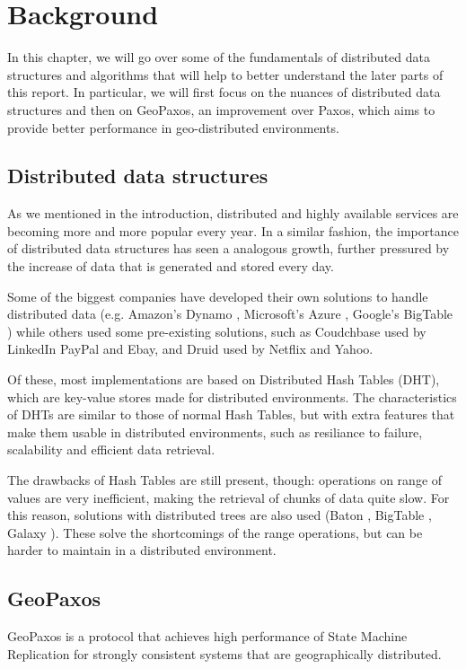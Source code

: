 \chapter{Background}\label{sec:Background}
In this chapter, we will go over some of the fundamentals of distributed data structures and algorithms that will help to better understand the later parts of this report. In particular, we will first focus on the nuances of distributed data structures and then on  GeoPaxos, an improvement over Paxos, which aims to provide better performance in geo-distributed environments.

\section{Distributed data structures}\label{sec:distributed-data-structures}
As we mentioned in the introduction, distributed and highly available services are becoming more and more popular every year. In a similar fashion, the importance of distributed data structures has seen a analogous growth, further pressured by the increase of data that is generated and stored every day. 

Some of the biggest companies have developed their own solutions to handle distributed data (e.g. Amazon's Dynamo \citep{dynamo}, Microsoft's Azure \citep{azure}, Google's BigTable \citep{bigtable}) while others used some pre-existing solutions, such as Coudchbase \citep{couchbase} used by LinkedIn PayPal and Ebay, and Druid \citep{druid} used by Netflix and Yahoo. 

Of these, most implementations are based on Distributed Hash Tables (DHT), which are key-value stores made for distributed environments.
The characteristics of DHTs are similar to those of normal Hash Tables, but with extra features that make them usable in distributed environments, such as resiliance to failure, scalability and efficient data retrieval.

The drawbacks of Hash Tables are still present, though: operations on range of values are very inefficient, making the retrieval of chunks of data quite slow. For this reason, solutions with distributed trees are also used (Baton \citep{baton}, BigTable \citep{bigtable}, Galaxy \citep{galaxy}). These solve the shortcomings of the range operations, but can be harder to maintain in a distributed environment. 

\section{GeoPaxos}\label{sec:GeoPaxos}
GeoPaxos \citep{geopaxos} is a protocol that achieves high performance of State Machine Replication for strongly consistent systems that are geographically distributed.

